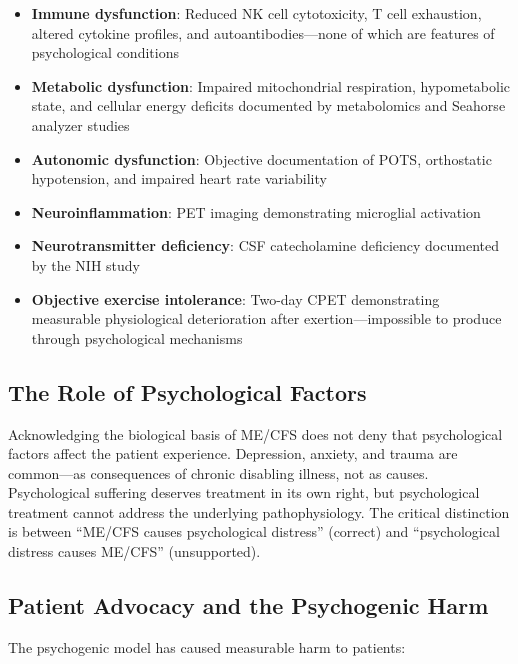 \begin{itemize}
    \item \textbf{Immune dysfunction}: Reduced NK cell cytotoxicity, T cell exhaustion, altered cytokine profiles, and autoantibodies---none of which are features of psychological conditions~\cite{Hardcastle2016, Che2025}
    \item \textbf{Metabolic dysfunction}: Impaired mitochondrial respiration, hypometabolic state, and cellular energy deficits documented by metabolomics and Seahorse analyzer studies~\cite{Naviaux2016metabolomics, Mandarano2020}
    \item \textbf{Autonomic dysfunction}: Objective documentation of POTS, orthostatic hypotension, and impaired heart rate variability~\cite{Hoad2008pots, Newton2007autonomicDysfunction}
    \item \textbf{Neuroinflammation}: PET imaging demonstrating microglial activation~\cite{Raijmakers2021Neuroinflammation}
    \item \textbf{Neurotransmitter deficiency}: CSF catecholamine deficiency documented by the NIH study~\cite{walitt2024deep}
    \item \textbf{Objective exercise intolerance}: Two-day CPET demonstrating measurable physiological deterioration after exertion---impossible to produce through psychological mechanisms~\cite{keller2024cpet}
\end{itemize}

\subsection{The Role of Psychological Factors}

Acknowledging the biological basis of ME/CFS does not deny that psychological factors affect the patient experience. Depression, anxiety, and trauma are common---as consequences of chronic disabling illness, not as causes. Psychological suffering deserves treatment in its own right, but psychological treatment cannot address the underlying pathophysiology. The critical distinction is between ``ME/CFS causes psychological distress'' (correct) and ``psychological distress causes ME/CFS'' (unsupported).

\subsection{Patient Advocacy and the Psychogenic Harm}

The psychogenic model has caused measurable harm to patients:

